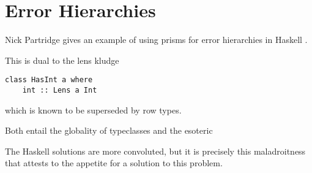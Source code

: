 \documentclass{article}
\begin{document}



\section{Error Hierarchies}

Nick Partridge gives an example of using prisms for error hierarchies in Haskell \cite{errorprisms}.

This is dual to the lens kludge

\begin{verbatim}
class HasInt a where
    int :: Lens a Int
\end{verbatim}

which is known to be superseded by row types.


Both entail the globality of typeclasses and the esoteric

The Haskell solutions are more convoluted, but it is precisely this maladroitness that attests to the appetite for a solution to this problem.
\end{document}
